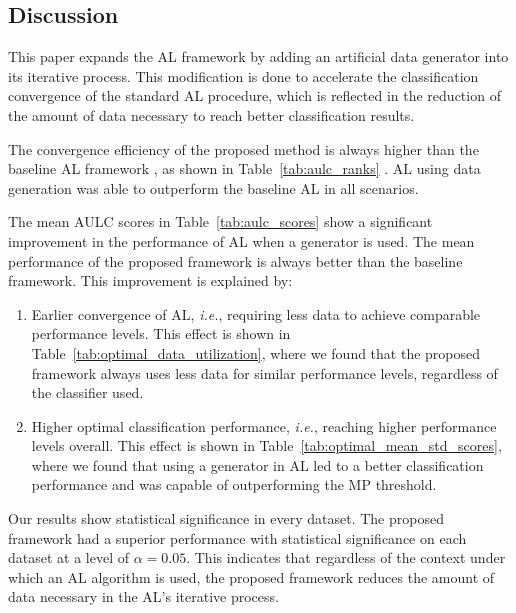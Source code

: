 \documentclass[remotesensing,article,submit,moreauthors,pdftex]{Definitions/mdpi}
\begin{document}
\begin{paracol}{2}
\subsection{Discussion}

This paper expands the AL framework by adding an artificial data generator
into its iterative process. This modification is done to accelerate the
classification convergence of the standard AL procedure, which is
reflected in the reduction of the amount of data necessary to reach better
classification results.

The convergence efficiency of the proposed method is always higher than the
baseline AL framework ,  as shown in Table~\ref{tab:aulc_ranks} .  AL
 using data generation was able to outperform the baseline AL
in  all scenarios. 

The mean AULC scores in Table~\ref{tab:aulc_scores} show a significant
improvement in the performance of AL when a generator is used. The mean
performance of the proposed framework is always better than the
baseline framework. This improvement is explained by:

\begin{enumerate}
    \item Earlier convergence of AL, \textit{i.e.}, requiring less data to
        achieve comparable performance levels. This effect is shown in
        Table~\ref{tab:optimal_data_utilization}, where we found that the
        proposed framework always uses less data for similar performance
        levels, regardless of the classifier used.
    \item Higher optimal classification performance, \textit{i.e.}, reaching
        higher performance levels overall. This effect is shown in
        Table~\ref{tab:optimal_mean_std_scores}, where we found that using a
        generator in AL led to a better classification performance and was
        capable of outperforming the MP threshold. 
\end{enumerate} 

Our results show statistical significance in every dataset. The proposed
framework had a superior performance with statistical significance on each
dataset at a level of $\alpha = 0.05$. This indicates that regardless of the
context under which an AL algorithm is used, the proposed framework reduces
the amount of data necessary in the AL's iterative process.


\end{paracol}
\end{document}
